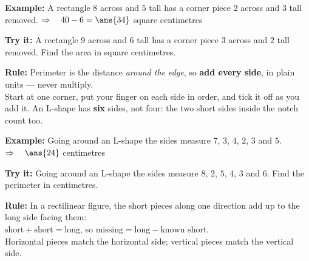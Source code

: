 \documentclass[12pt]{article}
\begin{document}
\begin{examplebox}
\textbf{Example:} A rectangle $8$ across and $5$ tall has a corner piece $2$ across and $3$ tall
removed.
$\Rightarrow\quad 40 - 6 = \ans{34}$ square centimetres
\end{examplebox}

\begin{tryitbox}
\textbf{Try it:} A rectangle $9$ across and $6$ tall has a corner piece $3$ across and $2$ tall
removed. Find the area in square centimetres.\\[2pt]
\end{tryitbox}


\begin{formulabox}
\textbf{Rule:} Perimeter is the distance \emph{around the edge}, so \textbf{add every side}, in
plain units --- never multiply.\\[3pt]
Start at one corner, put your finger on each side in order, and tick it off as you add it. An
L-shape has \textbf{six} sides, not four: the two short sides inside the notch count too.
\end{formulabox}

\begin{examplebox}
\textbf{Example:} Going around an L-shape the sides measure $7$, $3$, $4$, $2$, $3$ and $5$.
$\Rightarrow\quad \ans{24}$ centimetres
\end{examplebox}

\begin{tryitbox}
\textbf{Try it:} Going around an L-shape the sides measure $8$, $2$, $5$, $4$, $3$ and $6$.
Find the perimeter in centimetres.\\[2pt]
\end{tryitbox}


\begin{formulabox}
\textbf{Rule:} In a rectilinear figure, the short pieces along one direction add up to the long
side facing them:\\[3pt]
$\text{short} + \text{short} = \text{long}$, \quad so \quad
$\text{missing} = \text{long} - \text{known short}$.\\[3pt]
Horizontal pieces match the horizontal side; vertical pieces match the vertical side.
\end{formulabox}
\end{document}
